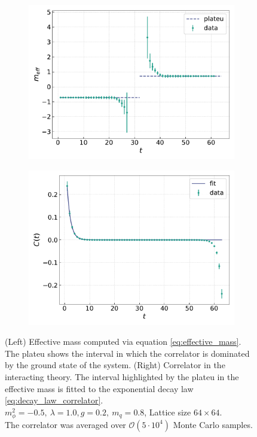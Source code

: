 \begin{figure}[h!]
    \centering
    \begin{subfigure}{0.45\textwidth}
        \includegraphics[width=\textwidth]{figures/effmass/effmass.pdf}
    \end{subfigure}
    \begin{subfigure}{0.45\textwidth}
        \includegraphics[width=\textwidth]{figures/effmass/corr.pdf}
    \end{subfigure}
    \caption[Effective mass]{(Left) Effective mass computed via equation \ref{eq:effective_mass}. The plateu shows the interval in which the correlator is dominated by the ground state of the system. (Right) Correlator in the interacting theory. The interval highlighted by the plateu in the effective mass is fitted to the exponential decay law \eqref{eq:decay_law_correlator}. \\ 
    $m_\phi^2=-0.5, \ \lambda=1.0, g=0.2, \ m_q = 0.8$, Lattice size $64 \times 64$. \\ The correlator was averaged over $\mathcal{O}(5 \cdot 10^4)$ Monte Carlo samples.}
    \label{fig:effective_mass}
\end{figure}

